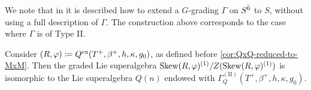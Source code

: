 
\begin{remark}
    We note that in \cite[Theorem 5.1]{paper-Qn} it is described how to extend a $G$-grading $\Gamma$ on $S^{\bar0}$ to $S$, without using a full description of $\Gamma$. 
    The construction above corresponds to the case where $\Gamma$ is of Type II. 
\end{remark}


    
    





\begin{prop}\label{prop:Ann-Type-II-correspondence}
    Consider $(R, \varphi) \coloneqq Q^{\mathrm{ex}}(T^+, \beta^+, h, \kappa, g_0)$, as defined before \cref{cor:QxQ-reduced-to-MxM}. 
    Then the graded Lie superalgebra $\operatorname{Skew} (R,\varphi)^{(1)}/Z(\operatorname{Skew} (R,\varphi)^{(1)})$ is isomorphic to the Lie superalgebra $Q(n)$ endowed with $\Gamma_Q^{\mathrm{(II)}}(T^+, \beta^+, h, \kappa, g_0)$. 
\end{prop}

